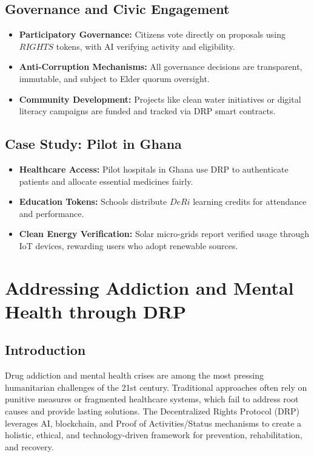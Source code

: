 \documentclass[11pt,a4paper]{article}
\begin{document}
\subsection{Governance and Civic Engagement}
\begin{itemize}
    \item \textbf{Participatory Governance:} Citizens vote directly on proposals using $RIGHTS$ tokens, with AI verifying activity and eligibility.
    \item \textbf{Anti-Corruption Mechanisms:} All governance decisions are transparent, immutable, and subject to Elder quorum oversight.
    \item \textbf{Community Development:} Projects like clean water initiatives or digital literacy campaigns are funded and tracked via DRP smart contracts.
\end{itemize}

\subsection{Case Study: Pilot in Ghana}
\begin{itemize}
    \item \textbf{Healthcare Access:} Pilot hospitals in Ghana use DRP to authenticate patients and allocate essential medicines fairly.
    \item \textbf{Education Tokens:} Schools distribute $DeRi$ learning credits for attendance and performance.
    \item \textbf{Clean Energy Verification:} Solar micro-grids report verified usage through IoT devices, rewarding users who adopt renewable sources.
\end{itemize}

\section{Addressing Addiction and Mental Health through DRP}

\subsection{Introduction}
Drug addiction and mental health crises are among the most pressing humanitarian challenges of the 21st century. Traditional approaches often rely on punitive measures or fragmented healthcare systems, which fail to address root causes and provide lasting solutions. The Decentralized Rights Protocol (DRP) leverages AI, blockchain, and Proof of Activities/Status mechanisms to create a holistic, ethical, and technology-driven framework for prevention, rehabilitation, and recovery.
\end{document}

